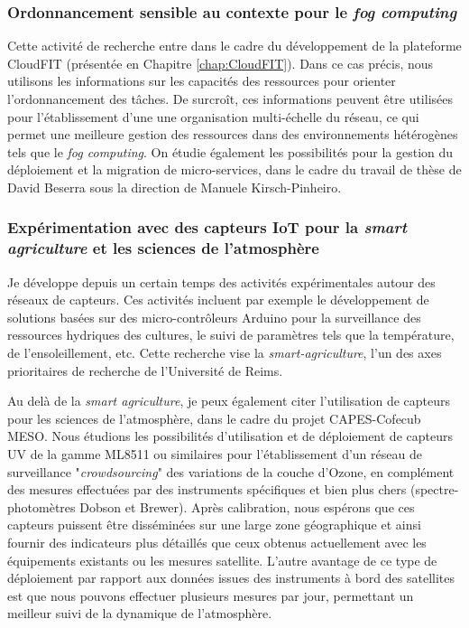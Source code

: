 \subsubsection*{Ordonnancement sensible au contexte pour le \textit{fog computing}}

Cette activité de recherche entre dans le cadre du développement de la plateforme CloudFIT (présentée en Chapitre \ref{chap:CloudFIT}). Dans ce cas précis, nous utilisons les informations sur les capacités des ressources pour orienter l'ordonnancement des tâches. De surcroît, ces informations peuvent être utilisées pour l'établissement d'une une organisation multi-échelle du réseau, ce qui permet une meilleure gestion des ressources dans des environnements hétérogènes tels que le \textit{fog computing}. On étudie également les possibilités pour la gestion du déploiement et la migration de  micro-services, dans le cadre du travail de thèse de David Beserra sous la direction de Manuele Kirsch-Pinheiro. 


\subsubsection*{Expérimentation avec des capteurs IoT pour la \textit{smart agriculture} et les sciences de l'atmosphère}

Je développe depuis un certain temps des activités expérimentales autour des réseaux de capteurs. Ces activités incluent par exemple le développement de solutions basées sur des micro-contrôleurs Arduino pour la surveillance des ressources hydriques des cultures, le suivi de paramètres tels que la température, de l'ensoleillement, etc. Cette recherche vise la \textit{smart-agriculture}, l'un des axes prioritaires de recherche de l'Université de Reims.

Au delà de la \textit{smart agriculture}, je peux également citer l'utilisation de capteurs pour les sciences de l'atmosphère, dans le cadre du projet CAPES-Cofecub MESO. Nous étudions les possibilités d'utilisation et de déploiement de capteurs UV de la gamme ML8511 ou similaires pour l'établissement d'un réseau de surveillance "\textit{crowdsourcing}" des variations de la couche d'Ozone, en complément des mesures effectuées par des instruments spécifiques et bien plus chers (spectre-photomètres Dobson et Brewer). Après calibration, nous espérons que ces capteurs puissent être disséminées sur une large zone géographique et ainsi fournir des indicateurs plus détaillés que ceux obtenus actuellement avec les équipements existants ou les mesures satellite. L'autre avantage de ce type de déploiement par rapport aux données issues des instruments à bord des satellites est que nous pouvons effectuer plusieurs mesures par jour, permettant un meilleur suivi de la dynamique de l'atmosphère.


